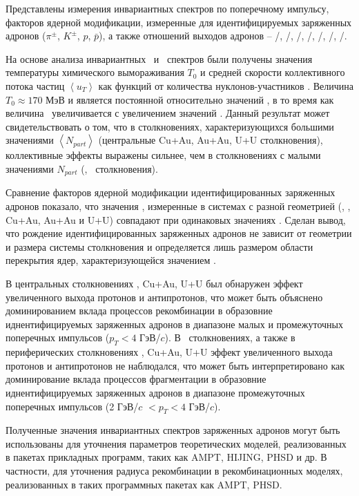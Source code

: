 Представлены измерения инвариантных спектров по поперечному импульсу, факторов ядерной модификации, измеренные для идентифицируемых заряженных адронов ($\pi^\pm$, $K^\pm$, $p$, $\bar{p}$), а также отношений выходов адронов -- \pim/\pip, \Km/\Kp, \prot/\aprot, \prot/\pip, \aprot/\pim, \Kp/\pip, \Km/\pim.

На основе анализа инвариантных \pt \ и \mt \ спектров были получены значения температуры химического вымораживания $T_{0}$ и средней скорости коллективного потока частиц $\left< u_T \right>$ как функций от количества нуклонов-участников \Npart.
Величина $T_{0}\approx170$ МэВ и является постоянной относительно значений \Npart, в то время как величина \ut \ увеличивается с увеличением значений \Npart. Данный результат может свидетельствовать о том, что в столкновениях, характеризующихся большими значениями $\left<N_{part}\right>$ (центральные Cu+Au, Au+Au, U+U столкновения), коллективные эффекты выражены сильнее, чем в столкновениях с малыми значениями $N_{part}$ (\pal, \heau \ столкновения).

Сравнение факторов ядерной модификации идентифицированных заряженных адронов показало, что значения \rab, измеренные в системах с разной геометрией (\dau, \heau, Cu+Au, Au+Au и U+U) совпадают при одинаковых значениях \Npart.
Сделан вывод, что рождение идентифицированных заряженных адронов не зависит от геометрии и размера системы столкновения и определяется лишь размером области перекрытия ядер, характеризующейся значением \Npart.

В центральных столкновениях \heau, Cu+Au, U+U был обнаружен эффект увеличенного выхода протонов и антипротонов, что может быть объяснено доминированием вклада процессов рекомбинации в образовние иднентифицируемых заряженных адронов в диапазоне малых и промежуточных поперечных импульсов ($p_{T}<4$ ГэВ/$c$). 
В \pal \ столкновениях, а также в периферических столкновениях \heau, Cu+Au, U+U эффект увеличенного выхода протонов и антипротонов не наблюдался, что может быть интерпретировано как доминирование вклада процессов фрагментации в образовние иднентифицируемых заряженных адронов в диапазоне промежуточных поперечных импульсов (2 ГэВ/$c$ $<p_{T}<4$ ГэВ/$c$).

Полученные значения инвариантных спектров заряженных адронов могут быть использованы для уточнения параметров теоретических моделей, реализованных в пакетах прикладных программ, таких как  AMPT, HIJING, PHSD и др. В частности, для уточнения радиуса рекомбинации в рекомбинационных моделях, реализованных в таких программных пакетах как AMPT, PHSD.